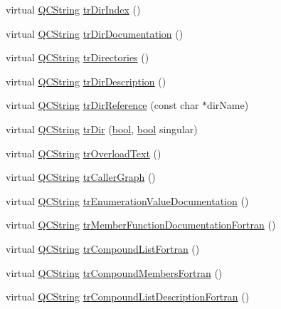 \begin{DoxyCompactItemize}
\item 
virtual \hyperlink{class_q_c_string}{Q\+C\+String} \hyperlink{class_translator_korean_a5c4fd5ffbb44f7651f9808b7ca324d1b}{tr\+Dir\+Index} ()
\item 
virtual \hyperlink{class_q_c_string}{Q\+C\+String} \hyperlink{class_translator_korean_ade40cfebcc4dd63032402d8fab3dcd66}{tr\+Dir\+Documentation} ()
\item 
virtual \hyperlink{class_q_c_string}{Q\+C\+String} \hyperlink{class_translator_korean_aaf735e849b61302e9546a94fb545ca0e}{tr\+Directories} ()
\item 
virtual \hyperlink{class_q_c_string}{Q\+C\+String} \hyperlink{class_translator_korean_a13c051ef5bb44c97e07ab91715858b92}{tr\+Dir\+Description} ()
\item 
virtual \hyperlink{class_q_c_string}{Q\+C\+String} \hyperlink{class_translator_korean_aacccc418b93495543610b3df476d404f}{tr\+Dir\+Reference} (const char $\ast$dir\+Name)
\item 
virtual \hyperlink{class_q_c_string}{Q\+C\+String} \hyperlink{class_translator_korean_a86717f83e00ae8877bf9bae2b41772dd}{tr\+Dir} (\hyperlink{qglobal_8h_a1062901a7428fdd9c7f180f5e01ea056}{bool}, \hyperlink{qglobal_8h_a1062901a7428fdd9c7f180f5e01ea056}{bool} singular)
\item 
virtual \hyperlink{class_q_c_string}{Q\+C\+String} \hyperlink{class_translator_korean_a02a2526670077f9d12f2c16dd836e4ed}{tr\+Overload\+Text} ()
\item 
virtual \hyperlink{class_q_c_string}{Q\+C\+String} \hyperlink{class_translator_korean_a5758b71ecd43c86e70bc4879f65e0067}{tr\+Caller\+Graph} ()
\item 
virtual \hyperlink{class_q_c_string}{Q\+C\+String} \hyperlink{class_translator_korean_af6d9e6bc52deeeca5ead7f9083f8099b}{tr\+Enumeration\+Value\+Documentation} ()
\item 
virtual \hyperlink{class_q_c_string}{Q\+C\+String} \hyperlink{class_translator_korean_af7a255882ab03e122e2dd6d5b1f7223b}{tr\+Member\+Function\+Documentation\+Fortran} ()
\item 
virtual \hyperlink{class_q_c_string}{Q\+C\+String} \hyperlink{class_translator_korean_aaadeec829930d258a7064f6a90545d4f}{tr\+Compound\+List\+Fortran} ()
\item 
virtual \hyperlink{class_q_c_string}{Q\+C\+String} \hyperlink{class_translator_korean_a3fc6d38e3bb16bef81009a67a76300ab}{tr\+Compound\+Members\+Fortran} ()
\item 
virtual \hyperlink{class_q_c_string}{Q\+C\+String} \hyperlink{class_translator_korean_aa5ac6f40895c988e82a039f24d0d7af2}{tr\+Compound\+List\+Description\+Fortran} ()

\end{DoxyCompactItemize}
